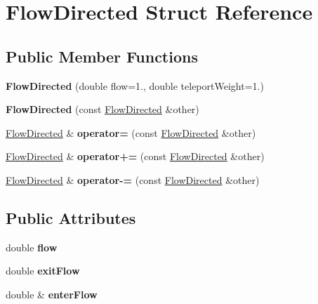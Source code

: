 \hypertarget{structFlowDirected}{}\section{Flow\+Directed Struct Reference}
\label{structFlowDirected}
\subsection*{Public Member Functions}
\begin{DoxyCompactItemize}
\item 
\mbox{\label{structFlowDirected_af7755700414532970aef30427349705f}} 
{\bfseries Flow\+Directed} (double flow=1., double teleport\+Weight=1.)
\item 
\mbox{\label{structFlowDirected_a0dfa88bdf8a5aef47971b6ea0f91148e}} 
{\bfseries Flow\+Directed} (const \mbox{\hyperlink{structFlowDirected}{Flow\+Directed}} \&other)
\item 
\mbox{\label{structFlowDirected_ab17275d7466a92f08358398eb3d7a682}} 
\mbox{\hyperlink{structFlowDirected}{Flow\+Directed}} \& {\bfseries operator=} (const \mbox{\hyperlink{structFlowDirected}{Flow\+Directed}} \&other)
\item 
\mbox{\label{structFlowDirected_a7cd107cbf1e7e3f22577aedcdff87139}} 
\mbox{\hyperlink{structFlowDirected}{Flow\+Directed}} \& {\bfseries operator+=} (const \mbox{\hyperlink{structFlowDirected}{Flow\+Directed}} \&other)
\item 
\mbox{\label{structFlowDirected_aee4a2813d609c25548f6a0bdb6de647b}} 
\mbox{\hyperlink{structFlowDirected}{Flow\+Directed}} \& {\bfseries operator-\/=} (const \mbox{\hyperlink{structFlowDirected}{Flow\+Directed}} \&other)
\end{DoxyCompactItemize}
\subsection*{Public Attributes}
\begin{DoxyCompactItemize}
\item 
\mbox{\label{structFlowDirected_a24c423cb75624ac2ab3b575971f53b71}} 
double {\bfseries flow}
\item 
\mbox{\label{structFlowDirected_a1dba1bece306f18eb250f9943df906e7}} 
double {\bfseries exit\+Flow}
\item 
\mbox{\label{structFlowDirected_ac4107c532a71a92ce6b5108b66295cf5}} 
double \& {\bfseries enter\+Flow}
\end{DoxyCompactItemize}
